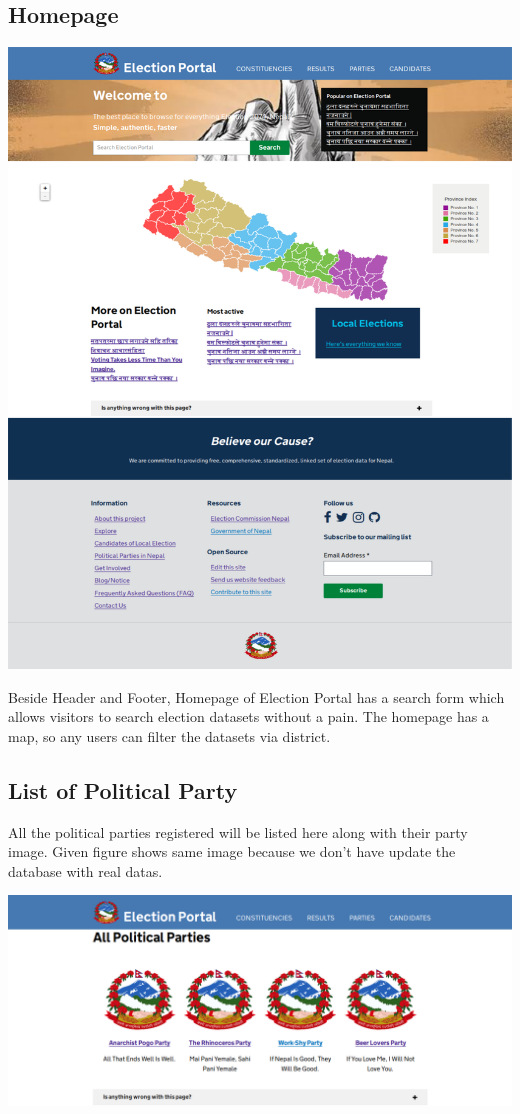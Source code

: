 \documentclass[12pt]{article}
\begin{document}
\subsection{Homepage}
\begin{center}
\includegraphics[scale=0.25]{Homepage.png}\\
\end{center}

Beside Header and Footer, Homepage of Election Portal has a search form which allows visitors to search election datasets without a pain. The homepage has a map, so any users can filter the datasets via district.
\newpage
\subsection{List of Political Party}
All the political parties registered will be listed here along with their party image. Given figure shows same image because we don't have update the database with real datas.\\
\begin{center}
\includegraphics[scale=0.25]{List_of_Political_Party.png}\\
\end{center}
\end{document}
